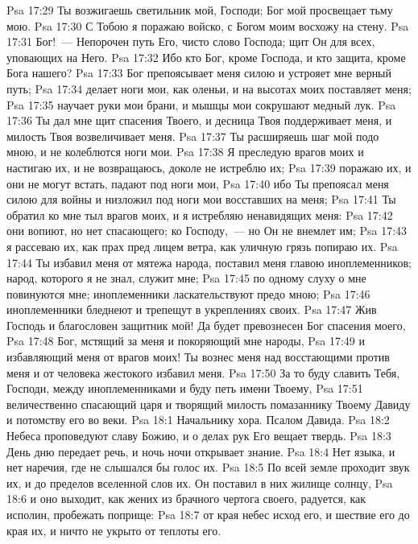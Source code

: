 \vs Psa 17:29 Ты возжигаешь светильник мой, Господи; Бог мой просвещает тьму мою.
\vs Psa 17:30 С Тобою я поражаю войско, с Богом моим восхожу на стену.
\vs Psa 17:31 Бог!~--- Непорочен путь Его, чисто слово Господа; щит Он для всех, уповающих на Него.
\vs Psa 17:32 Ибо кто Бог, кроме Господа, и кто защита, кроме Бога нашего?
\vs Psa 17:33 Бог препоясывает меня силою и устрояет мне верный путь;
\vs Psa 17:34 делает ноги мои, как оленьи, и на высотах моих поставляет меня;
\vs Psa 17:35 научает руки мои брани, и мышцы мои сокрушают медный лук.
\vs Psa 17:36 Ты дал мне щит спасения Твоего, и десница Твоя поддерживает меня, и милость Твоя возвеличивает меня.
\vs Psa 17:37 Ты расширяешь шаг мой подо мною, и не колеблются ноги мои.
\vs Psa 17:38 Я преследую врагов моих и настигаю их, и не возвращаюсь, доколе не истреблю их;
\vs Psa 17:39 поражаю их, и они не могут встать, падают под ноги мои,
\vs Psa 17:40 ибо Ты препоясал меня силою для войны и низложил под ноги мои восставших на меня;
\vs Psa 17:41 Ты обратил ко мне тыл врагов моих, и я истребляю ненавидящих меня:
\vs Psa 17:42 они вопиют, но нет спасающего; ко Господу,~--- но Он не внемлет им;
\vs Psa 17:43 я рассеваю их, как прах пред лицем ветра, как уличную грязь попираю их.
\vs Psa 17:44 Ты избавил меня от мятежа народа, поставил меня главою иноплеменников; народ, которого я не знал, служит мне;
\vs Psa 17:45 по одному слуху о мне повинуются мне; иноплеменники ласкательствуют предо мною;
\vs Psa 17:46 иноплеменники бледнеют и трепещут в укреплениях своих.
\vs Psa 17:47 Жив Господь и благословен защитник мой! Да будет превознесен Бог спасения моего,
\vs Psa 17:48 Бог, мстящий за меня и покоряющий мне народы,
\vs Psa 17:49 и избавляющий меня от врагов моих! Ты вознес меня над восстающими против меня и от человека жестокого избавил меня.
\vs Psa 17:50 За то буду славить Тебя, Господи, между иноплеменниками и буду петь имени Твоему,
\vs Psa 17:51 величественно спасающий царя и творящий милость помазаннику Твоему Давиду и потомству его во веки.
\vs Psa 18:1 Начальнику хора. Псалом Давида.
\rsbpar\vs Psa 18:2 Небеса проповедуют славу Божию, и о делах рук Его вещает твердь.
\vs Psa 18:3 День дню передает речь, и ночь ночи открывает знание.
\vs Psa 18:4 Нет языка, и нет наречия, где не слышался бы голос их.
\vs Psa 18:5 По всей земле проходит звук их, и до пределов вселенной слов их. Он поставил в них жилище солнцу,
\vs Psa 18:6 и оно выходит, как жених из брачного чертога своего, радуется, как исполин, пробежать поприще:
\vs Psa 18:7 от края небес исход его, и шествие его до края их, и ничто не укрыто от теплоты его.
